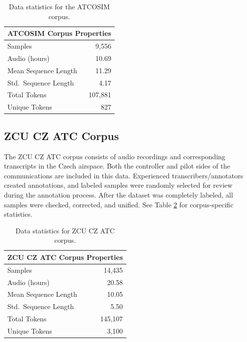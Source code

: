 \documentclass[12pt]{article}
\begin{document}
\begin{table}[!t]
    \centering
    \begin{tabular}{l r}
        \toprule
        \multicolumn{2}{c}{ATCOSIM Corpus Properties} \\
        \midrule
        Samples              & 9,556                  \\
        Audio (hours)        & 10.69                  \\
        Mean Sequence Length & 11.29                  \\
        Std.~Sequence Length & 4.17                   \\
        Total Tokens         & 107,881                \\
        Unique Tokens        & 827                    \\
        \bottomrule
    \end{tabular}
    \caption{Data statistics for the ATCOSIM corpus.}
    \label{tab:atcosim_stats}
\end{table}

\subsection{ZCU CZ ATC Corpus}\label{sec:zcu_atc}
The ZCU CZ ATC corpus consists of audio recordings and corresponding transcripts in the Czech airspace. Both the controller and pilot sides of the
communications are included in this data. Experienced transcribers/annotators created annotations, and labeled samples were randomly selected for
review during the annotation process. After the dataset was completely labeled, all samples were checked, corrected, and unified\cite{smidl_air_2019}.
See Table \ref{tab:zcu_cz_atc_stats} for corpus-specific statistics.

\begin{table}[!t]
    \centering
    \begin{tabular}{l r}
        \toprule
        \multicolumn{2}{c}{ZCU CZ ATC Corpus Properties} \\
        \midrule
        Samples              & 14,435                    \\
        Audio (hours)        & 20.58                     \\
        Mean Sequence Length & 10.05                     \\
        Std.~Sequence Length & 5.50                      \\
        Total Tokens         & 145,107                   \\
        Unique Tokens        & 3,100                     \\
        \bottomrule
    \end{tabular}
    \caption{Data statistics for ZCU CZ ATC corpus.}
    \label{tab:zcu_cz_atc_stats}
\end{table}
\end{document}
